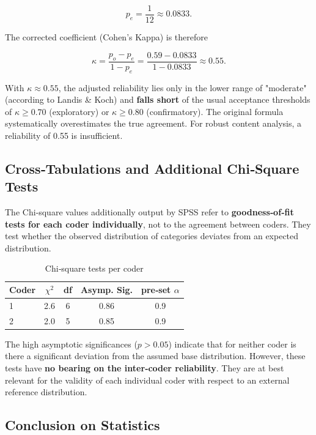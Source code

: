 \documentclass[
]{article}
\begin{document}
\[
p_e = \frac{1}{12} \approx 0.0833.
\]

The corrected coefficient (Cohen's Kappa) is therefore

\[
\kappa = \frac{p_o - p_e}{1 - p_e} = \frac{0.59 - 0.0833}{1 - 0.0833} \approx 0.55.
\]

With \(\kappa \approx 0.55\), the adjusted reliability lies only in the lower range of "moderate" (according to Landis \& Koch) and \textbf{falls short} of the usual acceptance thresholds of \(\kappa \ge 0.70\) (exploratory) or \(\kappa \ge 0.80\) (confirmatory). The original formula systematically overestimates the true agreement. For robust content analysis, a reliability of 0.55 is insufficient.

\subsection{Cross‑Tabulations and Additional Chi‑Square Tests}\label{cross-tabulations-and-additional-chi-square-tests}

The Chi‑square values additionally output by SPSS refer to \textbf{goodness‑of‑fit tests for each coder individually}, not to the agreement between coders. They test whether the observed distribution of categories deviates from an expected distribution.

\begin{table}[h]
\centering
\caption{Chi‑square tests per coder}
\label{tab:chisquare}
\begin{tabular}{@{} l c c c c @{}}
\toprule
Coder & \(\chi^2\) & df & Asymp. Sig. & pre‑set \(\alpha\) \\
\midrule
1 & 2.6 & 6 & 0.86 & 0.9 \\
2 & 2.0 & 5 & 0.85 & 0.9 \\
\bottomrule
\end{tabular}
\end{table}

The high asymptotic significances (\(p > 0.05\)) indicate that for neither coder is there a significant deviation from the assumed base distribution. However, these tests have \textbf{no bearing on the inter‑coder reliability}. They are at best relevant for the validity of each individual coder with respect to an external reference distribution.

\subsection{Conclusion on Statistics}\label{conclusion-on-statistics}
\end{document}
